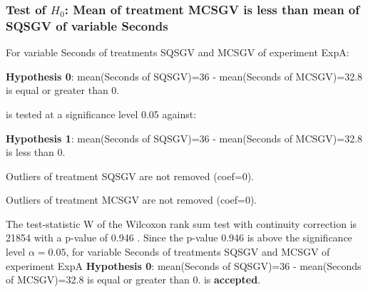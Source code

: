 \begin{frame}[t]
 \frametitle{Test of $H_{0}$: Mean of treatment MCSGV is less than mean of SQSGV of variable Seconds }
 \scriptsize
 For variable Seconds of treatments SQSGV and MCSGV of experiment ExpA:

\vspace{1mm}
{\bf Hypothesis 0}: mean(Seconds of SQSGV)=36 - mean(Seconds of MCSGV)=32.8 is equal or greater than 0.


 \begin{center} is tested at a significance level 0.05 against: \end{center}

{\bf Hypothesis 1}: mean(Seconds of SQSGV)=36 - mean(Seconds of MCSGV)=32.8 is less than 0.
\vspace{1mm}
\vspace{1mm}

 Outliers of treatment SQSGV  are not removed (coef=0).

 Outliers of treatment MCSGV  are not removed (coef=0).
\vspace{1mm}
 
 The test-statistic W of the Wilcoxon rank sum test with continuity correction is 21854 with a p-value of 0.946 .
 Since the p-value 0.946 is above the significance level $\alpha= 0.05 $,
 for variable Seconds of treatments SQSGV and MCSGV of experiment ExpA 
 {\bf Hypothesis 0}: mean(Seconds of SQSGV)=36 - mean(Seconds of MCSGV)=32.8 is equal or greater than 0.
is {\bf accepted}.

 \end{frame}
